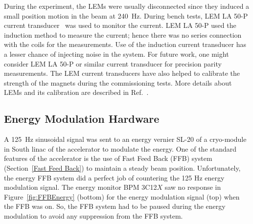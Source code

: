 During the experiment, the LEMs were usually disconnected since they induced a small position motion in the beam at 240~Hz. 
During bench tests, LEM LA 50-P current transducer~\cite{LEM_LA_55-P} was used to monitor the current. LEM LA 50-P used the induction method to measure the current; hence there was no series connection with the coils for the measurements. Use of the induction current transducer has a lesser chance of injecting noise in the system. For future work, one might consider LEM LA 50-P or similar current transducer for precision parity measurements. The LEM current transducers have also helped to calibrate the strength of the magnets during the commissioning tests. More details about LEMs and its calibration are described in Ref.~\cite{nur_bm_lem}.

\subsection{Energy Modulation Hardware}
\label{Energy Modulation Hardware}
A 125~Hz sinusoidal signal was sent to an energy vernier SL-20 of a cryo-module in South linac of the accelerator to modulate the energy.
One of the standard features of the accelerator is the use of Fast Feed Back (FFB) system (Section~\ref{Fast Feed Back}) to maintain a steady beam position. 
Unfortunately, the energy FFB system did a perfect job of countering the 125 Hz energy modulation signal. 
The energy monitor BPM 3C12$X$ saw no response in Figure~\ref{fig:FFBEnergy} (bottom) for the energy modulation signal (top) when the FFB was on. 
So, the FFB system had to be paused during the energy modulation to avoid any suppression from the FFB system. 

